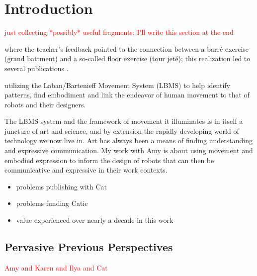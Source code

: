 \documentclass[arts,article,submit,moreauthors,pdftex,10pt,a4paper]{mdpi}
\begin{document}


\section{Introduction}

\textcolor{red}{just collecting *possibly* useful fragments; I'll write this section at the end}

where the teacher's feedback pointed to the connection between a barr\'{e} exercise (grand battment) and a so-called floor exercise (tour jet\'{e}); this realization led to several publications \cite{laviers2011ACC,laviers2011ICCPS,laviers2011IEEERAM}.  

utilizing the Laban/Bartenieff Movement System (LBMS) to help identify patterns, find embodiment and link the endeavor of human movement to that of robots and their designers.  

The LBMS system and the framework of movement it illuminates is in itself a juncture of art and science, and by extension the rapidly developing world of technology we now live in. Art has always been a means of finding understanding and expressive communication. My work with Amy is about using movement and embodied expression to inform the design of robots that can then be communicative and expressive in their work contexts. 

\begin{itemize}
\item problems publishing with Cat
\item problems funding Catie
\item value experienced over nearly a decade in this work
\end{itemize}

 

\subsection{Pervasive Previous Perspectives}

\textcolor{red}{Amy and Karen and Ilya and Cat}
\end{document}
